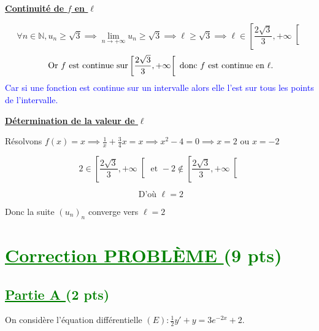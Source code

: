 \documentclass[12pt]{article}
\begin{document}
\begin{enumerate}
\textbf{\underline{Continuité de \( f \) en \( \ell \)}}

\[
\forall n\in \mathbb{N}, u_{n} \geq\sqrt{3} \implies \lim_{n \to +\infty}u_{n}\geq\sqrt{3} \implies \ell  \geq\sqrt{3} \implies \ell \in \left[ \frac{2\sqrt{3}}{3}, +\infty\right[ 
\]
\[
\text{ Or  \( f \) est continue sur} \left[ \frac{2\sqrt{3}}{3}, +\infty\right[ 
\text{ donc \( f \) est continue en } \ell .
\]
\textcolor{blue}{Car si une fonction est continue sur un intervalle alors elle l'est sur tous les points de l'intervalle.}

\textbf{\underline{Détermination de la valeur de \( \ell \)}}

Résolvons  \(f(x) = x\implies \frac{1}{x}+\frac{3}{4}x=x\implies x^{2}-4=0 \implies x=2 \text{ ou } x=-2\)

\[
2 \in \left[ \frac{2\sqrt{3}}{3}, +\infty\right[  \text{ et } -2 \notin \left[ \frac{2\sqrt{3}}{3}, +\infty\right[
\]

\[
\text{ D'où }  \ell =2
\]

Donc la suite \( (u_{n})_{n} \) converge vers \( \ell =2 \)

\end{enumerate}
\section*{\textcolor{green}{\underline{Correction PROBLÈME } (9 pts) }}
\subsection*{\textcolor{green}{\underline{Partie A }(2 pts)}}
On considère l'équation différentielle \((E):\frac{1}{2}y'+y=3e^{-2x}+2 \).
\end{document}
